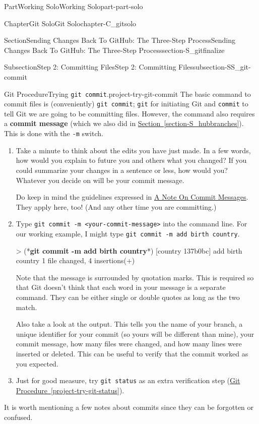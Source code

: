 \documentclass[oneside,10pt,]{book}
\newcommand{\xreffont}{\relax}
\newcommand{\mono}[1]{\texttt{#1}}
\newcommand{\terminology}[1]{\textbf{#1}}
\newcommand{\consoleinput}[1]{\textbf{#1}}
\begin{document}
\begin{partptx}{Part}{Working Solo}{}{Working Solo}{}{}{part-part-solo}
\begin{chapterptx}{Chapter}{Git Solo}{}{Git Solo}{}{}{chapter-C_gitsolo}
\begin{sectionptx}{Section}{Sending Changes Back To GitHub: The Three-Step Process}{}{Sending Changes Back To GitHub: The Three-Step Process}{}{}{section-S_gitfinalize}
\begin{subsectionptx}{Subsection}{Step 2: Committing Files}{}{Step 2: Committing Files}{}{}{subsection-SS_git-commit}
\begin{project}{Git Procedure}{Trying \mono{git commit}.}{project-try-git-commit}
The basic command to commit files is (conveniently) \mono{git commit}; \mono{git} for initiating Git and \mono{commit} to tell Git we are going to be committing files. However, the command also requires a \terminology{commit message} (which we also did in \hyperref[section-S_hubbranches]{Section~{\xreffont\ref{section-S_hubbranches}}}). This is done with the \mono{-m} switch.%
\begin{enumerate}[font=\bfseries,label=(\alph*),ref=\alph*]%
\item{}Take a minute to think about the edits you have just made. In a few words, how would you explain to future you and others what you changed? If you could summarize your changes in a sentence or less, how would you? Whatever you decide on will be your commit message.%
\par
Do keep in mind the guidelines expressed in \hyperref[assemblage-commitmessages]{A Note On Commit Messages}. They apply here, too! (And any other time you are committing.)%
\item{}Type \mono{git commit -m \textquotedbl{}<your-commit-message>\textquotedbl{}} into the command line. For our working example, I might type \mono{git commit -m \textquotedbl{}add birth country\textquotedbl{}}.%
\begin{console}{0}{1}{0}
> (*\consoleinput{git commit -m \textquotedbl{}add birth country\textquotedbl{}}*)
[country 137b0bc] add birth country
 1 file changed, 4 insertions(+)
\end{console}
Note that the message is surrounded by quotation marks. This is required so that Git doesn't think that each word in your message is a separate command. They can be either single or double quotes as long as the two match.%
\par
Also take a look at the output. This tells you the name of your branch, a unique identifier for your commit (so yours will be different than mine), your commit message, how many files were changed, and how many lines were inserted or deleted. This can be useful to verify that the commit worked as you expected.%
\item{}Just for good measure, try \mono{git status} as an extra verification step (\hyperref[project-try-git-status]{Git Procedure~{\xreffont\ref{project-try-git-status}}}).%
\end{enumerate}%
\end{project}%
 It is worth mentioning a few notes about commits since they can be forgotten or confused.%
\begin{enumerate}

\end{enumerate}
\end{subsectionptx}
\end{sectionptx}
\end{chapterptx}
\end{partptx}
\end{document}
